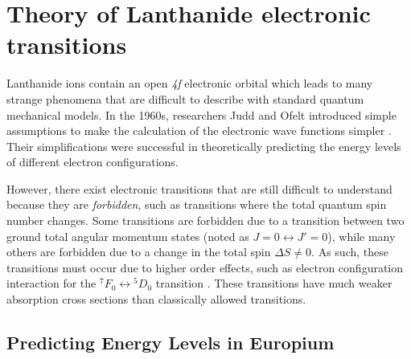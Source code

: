 \section{Theory of Lanthanide electronic transitions}\label{sec:theory_eu}

Lanthanide ions contain an open \textsl{4f} electronic orbital which leads to
many strange phenomena that are difficult to describe with standard quantum
mechanical models\cite{Wybourne:1968ez}. In the 1960s, researchers Judd and
Ofelt introduced simple assumptions to make the calculation of the electronic
wave functions simpler \cite{Judd:1962uq,Ofelt:1962kd}. Their simplifications
were successful in theoretically predicting the energy levels of different
electron configurations.

However, there exist electronic transitions that are still difficult to
understand because they are \emph{forbidden}, such as transitions where the
total quantum spin number changes. Some transitions are forbidden due to a
transition between two ground total angular momentum states (noted as $ J=0
\leftrightarrow J'=0 $), while many others are forbidden due to a change in
the total spin $\Delta S \neq 0$. As such, these transitions must occur due
to higher order effects, such as electron configuration interaction for the
${}^7F_0 \leftrightarrow {}^5D_0$ transition \cite{Jankowski:1981es}. These
transitions have much weaker absorption cross sections than classically
allowed transitions.



\subsection{Predicting Energy Levels in Europium}\label{subsec:predict_eu}

